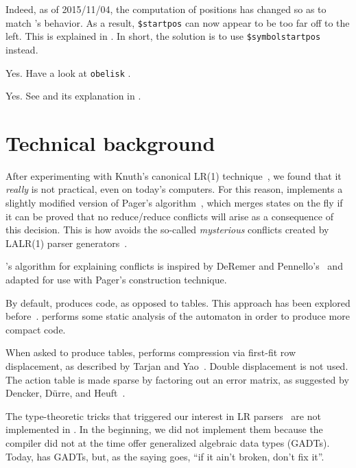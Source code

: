 \documentclass[onecolumn,11pt,nocopyrightspace,preprint]{sigplanconf}
\begin{document}
Indeed, as of 2015/11/04, the computation of positions has changed so as to match \ocamlyacc's
behavior. As a result, \texttt{\$startpos} can now appear to be too far off to the left. This is explained
in . In short, the solution is to use \verb+$symbolstartpos+ instead.

Yes. Have a look at \texttt{obelisk} \cite{obelisk}.

 Yes.
See  and its explanation in .


\section{Technical background}

After experimenting with Knuth's canonical LR(1) technique~\cite{knuth-lr-65},
we found that it \emph{really} is not practical, even on today's computers.
For this reason, \menhir implements a slightly modified version of Pager's
algorithm~\cite{pager-77}, which merges states on the fly if it can be proved
that no reduce/reduce conflicts will arise as a consequence of this decision.
This is how \menhir avoids the so-called \emph{mysterious} conflicts created
by LALR(1) parser generators~\cite[section 5.7]{bison}.

\menhir's algorithm for explaining conflicts is inspired by DeRemer and
Pennello's~\cite{deremer-pennello-82} and adapted for use with Pager's
construction technique.

By default, \menhir produces code, as opposed to tables. This approach has
been explored before~\cite{bhamidipaty-proebsting-98,horspool-faster-90}.
\menhir performs some static analysis of the automaton in order to produce
more compact code.

When asked to produce tables, \menhir performs compression via first-fit
row displacement, as described by Tarjan and Yao~\cite{tarjan-yao-79}.
Double displacement is not used. The action table is made sparse by
factoring out an error matrix, as suggested by Dencker, Dürre, and
Heuft~\cite{dencker-84}.

The type-theoretic tricks that triggered our interest in LR
parsers~\cite{pottier-regis-gianas-typed-lr} are not implemented in \menhir.
In the beginning, we did not implement them because the \ocaml compiler did
not at the time offer generalized algebraic data types (GADTs). Today, \ocaml
has GADTs, but, as the saying goes, ``if it ain't broken, don't fix it''.
\end{document}

